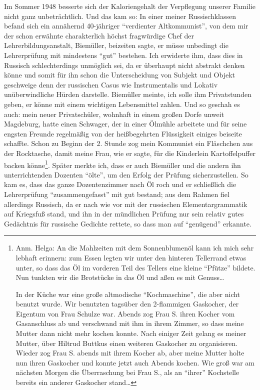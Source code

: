 \documentclass[a5paper,pagesize,10pt,twoside=true]{scrbook}
\renewcommand{\marginpar}[2][]{}
\begin{document}
Im Sommer 1948 besserte sich der Kaloriengehalt der Verpflegung unserer Familie nicht ganz unbeträchtlich. Und das kam so: In einer meiner Russischklassen befand sich ein annähernd 40-jähriger \enquote{verdienter Altkommunist}, von dem mir der schon erwähnte charakterlich höchst fragwürdige Chef der Lehrerbildungsanstalt, Biemüller, beizeiten sagte, er müsse unbedingt die Lehrerprüfung mit mindestens \enquote{gut} bestehen. \marginpar{143} Ich erwiderte ihm, dass dies in Russisch schlechterdings unmöglich sei, da er überhaupt nicht abstrakt denken könne und somit für ihn schon die Unterscheidung von Subjekt und Objekt geschweige denn der russischen Casus wie Instrumentalis und Lokativ unüberwindliche Hürden darstelle. Biemüller meinte, ich solle ihm Privatstunden geben, er könne mit einem wichtigen Lebensmittel zahlen. Und so geschah es auch: mein neuer Privatschüler, wohnhaft in einem großen Dorfe unweit Magdeburg, hatte einen Schwager, der in einer Ölmühle arbeitete und für seine engsten Freunde regelmäßig von der heißbegehrten Flüssigkeit einiges beiseite schaffte. Schon zu Beginn der 2. Stunde zog mein Kommunist ein Fläschchen aus der Rocktasche, damit meine Frau, wie er sagte, für die Kinderlein Kartoffelpuffer backen könne\footnote{Anm. Helga: An die Mahlzeiten mit dem Sonnenblumenöl kann ich mich sehr lebhaft erinnern: zum Essen legten wir unter den hinteren Tellerrand etwas unter, so dass das Öl im vorderen Teil des Tellers eine kleine \enquote{Pfütze} bildete. Nun tunkten wir die Brotstücke in das Öl und aßen es mit Genuss\dots
	
	In der Küche war eine große altmodische \enquote{Kochmaschine}, die aber nicht benutzt wurde. Wir benutzten tagsüber den 2-flammigen Gaskocher, der Eigentum von Frau Schulze war. Abends zog Frau S. ihren Kocher vom Gasanschluss ab und verschwand mit ihm in ihrem Zimmer, so dass meine Mutter dann nicht mehr kochen konnte. Nach einiger Zeit gelang es meiner Mutter, über Hiltrud Buttkus einen weiteren Gaskocher zu organisieren. Wieder zog Frau S. abends mit ihrem Kocher ab, aber meine Mutter holte nun ihren Gaskocher und konnte jetzt auch Abends kochen. Wie groß war am nächsten Morgen die Überraschung bei Frau S., als an \enquote{ihrer} Kochstelle bereits ein anderer Gaskocher stand\dots}. Später merkte ich, dass er auch Biemüller und die andern ihn unterrichtenden Dozenten \enquote{ölte}, um den Erfolg der Prüfung sicherzustellen. So kam es, dass das ganze Dozentenzimmer nach Öl roch und er schließlich die Lehrerprüfung \enquote{zusammengefasst} mit gut bestand; aus dem Rahmen fiel allerdings Russisch, da er nach wie vor mit der russischen Elementargrammatik auf Kriegsfuß stand, und ihn in der mündlichen Prüfung nur sein relativ gutes Gedächtnis für russische Gedichte rettete, so dass man auf \enquote{genügend} erkannte.
\end{document}
